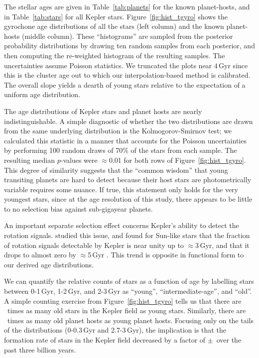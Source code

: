 \documentclass[11pt,twocolumn,tighten]{aastex63}
\begin{document}
The stellar ages 
are given in Table~\ref{tab:planets} for the known planet-hosts,
and in Table~\ref{tab:stars} for all Kepler stars.  Figure~\ref{fig:hist_tgyro} shows the gyrochone
age distributions of all the stars (left column) and the known
planet-hosts (middle column).  These ``histograms'' are sampled from
the posterior probability distributions by drawing ten random samples
from each posterior, and then computing the re-weighted
histogram of the resulting samples.  The uncertainties assume Poisson
statistics.  We truncated the plots near $4$\,Gyr since this is the
cluster age out to which our interpolation-based method is calibrated.
The overall slope yields a dearth of young stars relative to the expectation
of a uniform age distribution.

The age distributions of Kepler stars and planet hosts are
nearly indistinguishable.  A simple diagnostic of whether the two
distributions are drawn from the same underlying distribution is the
Kolmogorov-Smirnov test;  we calculated this statistic in a manner
that accounts for the Poisson uncertainties by performing 100 random
draws of 70\% of the stars from each sample.  The resulting median
$p$-values were $\approx$0.01 for both rows of
Figure~\ref{fig:hist_tgyro}.  This degree of similarity suggests that
the ``common wisdom'' that young transiting planets are hard to detect
because their host stars are photometrically variable requires some
nuance.  If true, this statement only holds for the very youngest
stars, since at the age resolution of this study, there appears to be
little to no selection bias against sub-gigayear planets. 

An important separate selection effect concerns Kepler's ability to
detect the rotation signals.  \citet{2022ApJ...937...94M} studied this
issue, and found for Sun-like stars that the fraction of rotation
signals detectable by Kepler is near unity up to $\approx$3\,Gyr, and
that it drops to almost zero by $\approx$5\,Gyr .  This trend is
opposite in functional form to our derived age distributions.

We can quantify the relative counts of stars as a function of age by
labelling stars between 0-1\,Gyr, 1-2\,Gyr, and 2-3\,Gyr as ``young'',
``intermediate-age'', and ``old''.  A simple counting exercise from
Figure~\ref{fig:hist_tgyro} tells us that there are \ratioobtoybstars\
times as many old stars in the Kepler field as young stars.
Similarly, there are \ratioobtoybplanets\ times as many old planet
hosts as young planet hosts.  Focusing only on the tails of the
distributions (0-0.3\,Gyr and 2.7-3\,Gyr), the implication is that the
formation rate of stars in the Kepler field decreased by a factor of
\ratiosfr$\pm$\uncratiosfr\ over the past three billion years.
\end{document}
